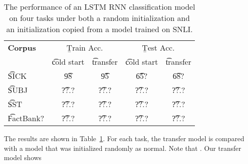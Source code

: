 \begin{table}
\begin{center}
\begin{tabular}{l@{\hskip \colspaceL}c@{\hskip \colspaceS}c@{\hskip \colspaceS}c@{\hskip \colspaceS}c}
\hline
\textbf{Corpus} & \multicolumn{2}{c}{\b{Train Acc.}} &\multicolumn{2}{c}{ \b{Test Acc.}} \\
 & \t{cold start} & \t{transfer} & \t{cold start} & \t{transfer}  \\
\hline
\t{SICK}            & \t{98} & \t{95} & \t{65?} & \t{68?}  \\
\t{SUBJ}          & \t{??.?} & \t{??.?} & \t{??.?} & \t{??.?} \\
\t{SST}          & \t{??.?} & \t{??.?} & \t{??.?} & \t{??.?} \\
\t{FactBank?}          & \t{??.?} & \t{??.?} & \t{??.?} & \t{??.?} \\
\hline
\end{tabular}
\end{center}
\caption{\label{tab:transferresults}
The performance of an LSTM RNN classification model on four tasks under both a random initialization and an initialization copied from a model trained on SNLI.
}
\end{table}

The results are shown in Table~\ref{tab:transferresults}. For each task, the transfer model is compared with a model that was initialized randomly as normal. Note that . Our transfer model shows 